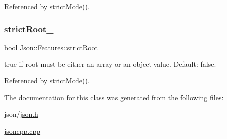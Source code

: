 Referenced by strict\+Mode().

\mbox{\label{classJson_1_1Features_a1162c37a1458adc32582b585b552f9c3_a1162c37a1458adc32582b585b552f9c3}} 
\subsubsection{\texorpdfstring{strict\+Root\+\_\+}{strictRoot\_}}
{\footnotesize\ttfamily bool Json\+::\+Features\+::strict\+Root\+\_\+}

{\ttfamily true} if root must be either an array or an object value. Default\+: {\ttfamily false}. 

Referenced by strict\+Mode().



The documentation for this class was generated from the following files\+:\begin{DoxyCompactItemize}
\item 
json/\hyperlink{json_8h}{json.\+h}\item 
\hyperlink{jsoncpp_8cpp}{jsoncpp.\+cpp}\end{DoxyCompactItemize}
